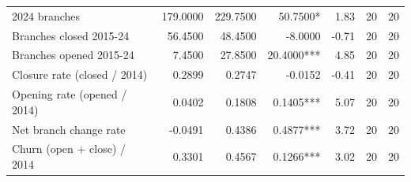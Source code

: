 \begin{tabular}{lrrrrrr}
2024 branches & 179.0000 & 229.7500 & 50.7500* & 1.83 & 20 & 20 \\
Branches closed 2015-24 & 56.4500 & 48.4500 & -8.0000 & -0.71 & 20 & 20 \\
Branches opened 2015-24 & 7.4500 & 27.8500 & 20.4000*** & 4.85 & 20 & 20 \\
Closure rate (closed / 2014) & 0.2899 & 0.2747 & -0.0152 & -0.41 & 20 & 20 \\
Opening rate (opened / 2014) & 0.0402 & 0.1808 & 0.1405*** & 5.07 & 20 & 20 \\
Net branch change rate & -0.0491 & 0.4386 & 0.4877*** & 3.72 & 20 & 20 \\
Churn (open + close) / 2014 & 0.3301 & 0.4567 & 0.1266*** & 3.02 & 20 & 20 \\
\bottomrule
\end{tabular}


